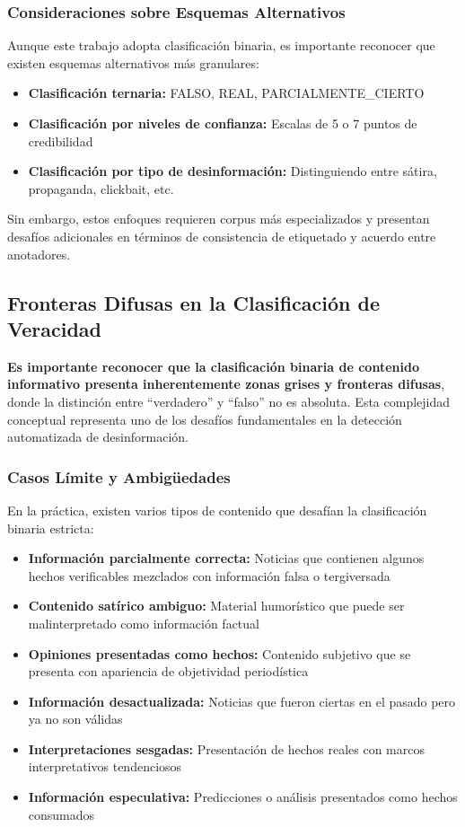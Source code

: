 \subsubsection{Consideraciones sobre Esquemas Alternativos}

Aunque este trabajo adopta clasificación binaria, es importante reconocer que existen esquemas alternativos más granulares:

\begin{itemize}
    \item \textbf{Clasificación ternaria:} FALSO, REAL, PARCIALMENTE\_CIERTO
    \item \textbf{Clasificación por niveles de confianza:} Escalas de 5 o 7 puntos de credibilidad
    \item \textbf{Clasificación por tipo de desinformación:} Distinguiendo entre sátira, propaganda, clickbait, etc.
\end{itemize}

Sin embargo, estos enfoques requieren corpus más especializados y presentan desafíos adicionales en términos de consistencia de etiquetado y acuerdo entre anotadores.

\subsection{Fronteras Difusas en la Clasificación de Veracidad}
\label{subsec:fronteras_difusas}

\textbf{Es importante reconocer que la clasificación binaria de contenido informativo presenta inherentemente zonas grises y fronteras difusas}, donde la distinción entre ``verdadero'' y ``falso'' no es absoluta. Esta complejidad conceptual representa uno de los desafíos fundamentales en la detección automatizada de desinformación.

\subsubsection{Casos Límite y Ambigüedades}

En la práctica, existen varios tipos de contenido que desafían la clasificación binaria estricta:

\begin{itemize}
    \item \textbf{Información parcialmente correcta:} Noticias que contienen algunos hechos verificables mezclados con información falsa o tergiversada
    \item \textbf{Contenido satírico ambiguo:} Material humorístico que puede ser malinterpretado como información factual
    \item \textbf{Opiniones presentadas como hechos:} Contenido subjetivo que se presenta con apariencia de objetividad periodística
    \item \textbf{Información desactualizada:} Noticias que fueron ciertas en el pasado pero ya no son válidas
    \item \textbf{Interpretaciones sesgadas:} Presentación de hechos reales con marcos interpretativos tendenciosos
    \item \textbf{Información especulativa:} Predicciones o análisis presentados como hechos consumados
\end{itemize}

